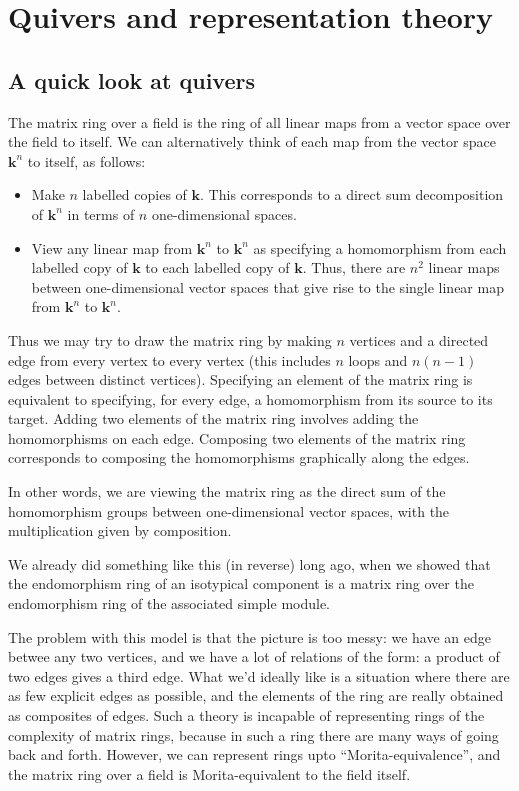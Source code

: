 \documentclass[a4paper]{amsart}
\newcommand{\field}{\mathbf{k}}
\begin{document}
\section{Quivers and representation theory}

\subsection{A quick look at quivers}

The matrix ring over a field is the ring of all linear maps from a
vector space over the field to itself. We can alternatively think of
each map from the vector space $\field^n$ to itself, as follows:

\begin{itemize}

\item Make $n$ labelled copies of $\field$. This corresponds to a
  direct sum decomposition of $\field^n$ in terms of $n$
  one-dimensional spaces.
\item View any linear map from $\field^n$ to $\field^n$ as specifying
  a homomorphism from each labelled copy of $\field$ to each labelled
  copy of $\field$. Thus, there are $n^2$ linear maps between
  one-dimensional vector spaces that give rise to the single linear
  map from $\field^n$ to $\field^n$.
\end{itemize}

Thus we may try to draw the matrix ring by making $n$ vertices and a
directed edge from every vertex to every vertex (this includes $n$
loops and $n(n-1)$ edges between distinct vertices). Specifying an
element of the matrix ring is equivalent to specifying, for every
edge, a homomorphism from its source to its target. Adding two
elements of the matrix ring involves adding the homomorphisms on each
edge.  Composing two elements of the matrix ring corresponds to
composing the homomorphisms graphically along the edges.

In other words, we are viewing the matrix ring as the direct sum of
the homomorphism groups between one-dimensional vector spaces, with
the multiplication given by composition.

We already did something like this (in reverse) long ago, when we
showed that the endomorphism ring of an isotypical component is a
matrix ring over the endomorphism ring of the associated simple
module.

The problem with this model is that the picture is too messy: we have
an edge betwee any two vertices, and we have a lot of relations of the
form: a product of two edges gives a third edge. What we'd ideally
like is a situation where there are as few explicit edges as possible,
and the elements of the ring are really obtained as composites of
edges. Such a theory is incapable of representing rings of the
complexity of matrix rings, because in such a ring there are many ways
of going back and forth. However, we can represent rings upto
``Morita-equivalence'', and the matrix ring over a field is
Morita-equivalent to the field itself.
\end{document}
